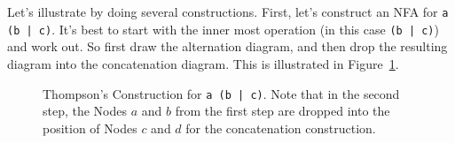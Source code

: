 \documentclass[letterpaper,12pt,openany,reqno]{book}%
\newcommand{\faterminalnode}[3] {\draw (#1) circle [radius=9pt]; \node at (#1) (#2) [circle, draw, minimum size=24pt] {#2};}
\newcommand{\fastart}[1] {\coordinate (start) at (#1);}
\newcommand{\fanonterminalnode}[2] {\node at (#1) (#2) [circle, draw, minimum size=24pt] {#2};}
\newcommand{\fanolabel}[2] {\node at (#1) (#2) [circle, draw, minimum size=24pt] {};}
\newcommand{\fatransition}[3] {\draw [->] (#1) -- (#2) node [midway, above] {#3};}
\begin{document}
Let's illustrate by doing several constructions. First, let's construct an NFA for \texttt{a (b | c)}. It's best to start with the inner most operation (in this case \texttt{(b | c)}) and work out. So first draw the alternation diagram, and then drop the resulting diagram into the concatenation diagram. This is illustrated in Figure~\ref{F.ThompsonsExample1}.

\begin{figure}[hbt]
\centering



 \caption[Thompson's Construction for \texttt{a (b | c)}]{Thompson's Construction for \texttt{a (b | c)}. Note that in the second step, the Nodes $a$ and $b$ from the first step are dropped into the position of Nodes $c$ and $d$ for the concatenation construction.}
  \label{F.ThompsonsExample1}
\end{figure}
\end{document}
